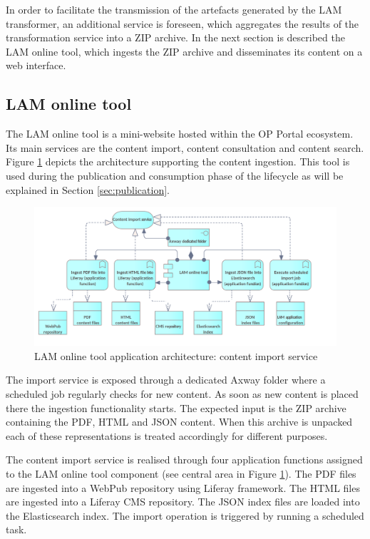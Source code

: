 	In order to facilitate the transmission of the artefacts generated by the LAM transformer, an additional service is foreseen, which aggregates the results of the transformation service into a ZIP archive. In the next section is described the LAM online tool, which ingests the ZIP archive and disseminates its content on a web interface. 
	
	\subsection{LAM online tool}
	
	The LAM online tool is a mini-website hosted within the OP Portal ecosystem. Its main services are the content import, content consultation and content search. Figure \ref{fig:app-online-tool-ingestion} depicts the architecture supporting the content ingestion. 
	This tool is used during the publication and consumption phase of the lifecycle as will be explained in Section \ref{sec:publication}.
		
    \begin{figure}[!h]
		\centering
		\includegraphics[width=.98\textwidth]{images/application/Online tool - import.png}
		\caption{LAM online tool application architecture: content import service}
		\label{fig:app-online-tool-ingestion}
	\end{figure}	

	The import service is exposed through a dedicated Axway folder where a scheduled job regularly checks for new content. As soon as new content is placed there the ingestion functionality starts. The expected input is the ZIP archive containing the PDF, HTML and JSON content. When this archive is unpacked each of these representations is treated accordingly for different purposes.
	
	The content import service is realised through four application functions assigned to the LAM online tool component (see central area in Figure \ref{fig:app-online-tool-ingestion}). The PDF files are ingested into a WebPub repository using Liferay framework. The HTML files are ingested into a Liferay CMS repository. The JSON index files are loaded into the Elasticsearch index. The import operation is triggered by running a scheduled task. 
	
